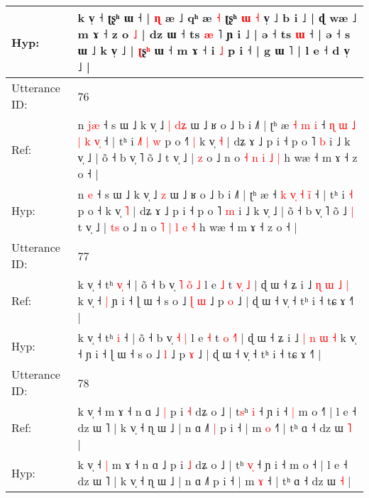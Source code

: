 \documentclass[10pt]{article}
\DeclareRobustCommand{\hl}[1]{{\textcolor{red}{#1}}}
\begin{document}
\begin{longtable}{ll}
 \\
Hyp: & k v̩ ˧ ʈʂʰ ɯ ˧ | \hl{ɳ} æ ˩ qʰ æ \hl{˧} ʈʂʰ\hl{}\hl{} \hl{ɯ} \hl{˧} v̩ ˩ b i ˩ | ɖ wæ ˩ m ɤ ˧ z o \hl{˩} | dz ɯ ˧ ts \hl{æ} ˥ ɲ i ˩ | ə ˧ ts \hl{ɯ} ˧ | ə ˧ s ɯ ˩ k v̩ ˩ | \hl{ʈ}ʂ\hl{ʰ} ɯ ˧ m ɤ ˧\hl{}\hl{} i\hl{}\hl{} \hl{˩} p i ˧ | g ɯ\hl{}\hl{}\hl{}\hl{}\hl{}\hl{} ˥ | l e ˧ d v̩ ˩ |
 \\
\midrule
Utterance ID: & 76 \\
Ref: & n \hl{j}\hl{æ} ˧ s ɯ ˩ k v̩ ˩\hl{ }\hl{|} \hl{d}\hl{ʑ} ɯ ˩ ʁ o ˩ b i ˩˥ | ʈʰ æ\hl{ }\hl{˧}\hl{ }\hl{m}\hl{ }\hl{i} ˧\hl{ }\hl{ɳ} \hl{ɯ} \hl{˩}\hl{ }\hl{|} \hl{k} \hl{v}\hl{̩} ˧ | tʰ i\hl{ }\hl{˩}\hl{˥}\hl{ }\hl{|} \hl{w} p o ˧\hl{˥}\hl{ }\hl{|} k v̩ \hl{˧} | dʑ ɤ ˩ p i ˧ p o ˥ \hl{b} i ˩ k v̩ ˩ | õ ˧ b v̩ ˥ õ ˩\hl{}\hl{} t v̩ ˩ | \hl{}\hl{z} o ˩ n o \hl{˧} \hl{n} \hl{i} \hl{˩} \hl{|} h wæ ˧ m ɤ ˧ z o ˧ |
 \\
Hyp: & n \hl{}\hl{e} ˧ s ɯ ˩ k v̩ ˩\hl{}\hl{} \hl{}\hl{z} ɯ ˩ ʁ o ˩ b i ˩˥ | ʈʰ æ\hl{}\hl{}\hl{}\hl{}\hl{}\hl{} ˧\hl{}\hl{} \hl{k} \hl{}\hl{v}\hl{̩} \hl{˧} \hl{i}\hl{̃} ˧ | tʰ i\hl{}\hl{}\hl{}\hl{}\hl{} \hl{˧} p o ˧\hl{}\hl{}\hl{} k v̩ \hl{˥} | dʑ ɤ ˩ p i ˧ p o ˥ \hl{m} i ˩ k v̩ ˩ | õ ˧ b v̩ ˥ õ ˩\hl{ }\hl{|} t v̩ ˩ | \hl{t}\hl{s} o ˩ n o \hl{˥} \hl{|} \hl{l} \hl{e} \hl{˧} h wæ ˧ m ɤ ˧ z o ˧ |
 \\
\midrule
Utterance ID: & 77 \\
Ref: & k v̩ ˧ tʰ \hl{v}\hl{̩} ˧ | õ ˧ b v̩\hl{ }\hl{˥} \hl{o}\hl{̃} \hl{˩} l e \hl{˩} t \hl{v}\hl{̩}\hl{ }\hl{˩} | ɖ ɯ ˧ ʑ i ˩ \hl{ɳ} \hl{ɯ} \hl{˩} \hl{|} k v̩ ˧\hl{ }\hl{|} ɲ i ˧ ɭ ɯ ˧ s o ˩\hl{ }\hl{ɭ} \hl{ɯ} ˩ p \hl{o} ˩ | ɖ ɯ ˧ v̩ ˧ tʰ i ˧ tɕ ɤ ˧˥ |
 \\
Hyp: & k v̩ ˧ tʰ \hl{}\hl{i} ˧ | õ ˧ b v̩\hl{}\hl{} \hl{}\hl{˧} \hl{|} l e \hl{˧} t \hl{o}\hl{ }\hl{˧}\hl{˥} | ɖ ɯ ˧ ʑ i ˩ \hl{|} \hl{n} \hl{ɯ} \hl{˧} k v̩ ˧\hl{}\hl{} ɲ i ˧ ɭ ɯ ˧ s o ˩\hl{}\hl{} \hl{l} ˩ p \hl{ɤ} ˩ | ɖ ɯ ˧ v̩ ˧ tʰ i ˧ tɕ ɤ ˧˥ |
 \\
\midrule
Utterance ID: & 78 \\
Ref: & k v̩ ˧\hl{}\hl{} m ɤ ˧ n ɑ ˩\hl{ }\hl{|} p i \hl{˧} dʑ o ˩ | t\hl{s}ʰ \hl{}\hl{i} ˧ ɲ i ˧\hl{ }\hl{|} m o ˧\hl{˥} | l e ˧ dz ɯ ˥ | k v̩ ˧ ɳ ɯ ˩ | n ɑ ˩˥\hl{ }\hl{|} p i ˧ | m \hl{o} ˧\hl{˥} | tʰ ɑ ˧ dz ɯ \hl{˥} |
 \\
Hyp: & k v̩ ˧\hl{ }\hl{|} m ɤ ˧ n ɑ ˩\hl{}\hl{} p i \hl{˩} dʑ o ˩ | t\hl{}ʰ \hl{v}\hl{̩} ˧ ɲ i ˧\hl{}\hl{} m o ˧\hl{} | l e ˧ dz ɯ ˥ | k v̩ ˧ ɳ ɯ ˩ | n ɑ ˩˥\hl{}\hl{} p i ˧ | m \hl{ɤ} ˧\hl{} | tʰ ɑ ˧ dz ɯ \hl{˧} |
 \\

\end{longtable}
\end{document}
